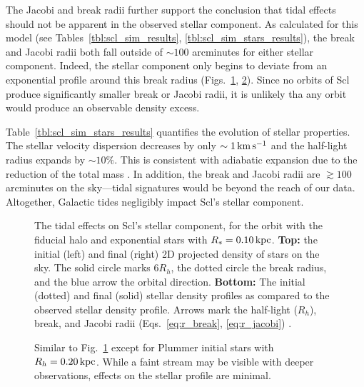 The Jacobi and break radii further support the conclusion that tidal
effects should not be apparent in the observed stellar component. As
calculated for this model (see
Tables~\ref{tbl:scl_sim_results}, \ref{tbl:scl_sim_stars_results}), the
break and Jacobi radii both fall outside of \(\sim 100\) arcminutes for
either stellar component. Indeed, the stellar component only begins to
deviate from an exponential profile around this break radius
(Figs.~\ref{fig:scl_smallperi_i_f}, \ref{fig:scl_smallperi_plummer_i_f}).
Since no orbits of Scl produce significantly smaller break or Jacobi
radii, it is unlikely tha any orbit would produce an observable density
excess.

Table~\ref{tbl:scl_sim_stars_results} quantifies the evolution of
stellar properties. The stellar velocity dispersion decreases by only
\(\sim1\,{\rm km\,s^{-1}}\) and the half-light radius expands by \(\sim 10\%\). This
is consistent with adiabatic expansion due to the reduction of the total
mass \citep[e.g.,][]{stucker+2023}. In addition, the break and Jacobi
radii are \(\gtrsim 100\) arcminutes on the sky---tidal signatures would
be beyond the reach of our data. Altogether, Galactic tides negligibly
impact Scl's stellar component.

\begin{figure}
\centering
{}
\caption[Sculptor initial and final density profiles]{The tidal effects
on Scl's stellar component, for the \smallperi{} orbit with the fiducial
halo and exponential stars with \(R_s=0.10\,{\rm kpc}\). \textbf{Top:} the
initial (left) and final (right) 2D projected density of stars on the
sky. The solid circle marks \(6R_h\), the dotted circle the break
radius, and the blue arrow the orbital direction. \textbf{Bottom:} The
initial (dotted) and final (solid) stellar density profiles as compared
to the observed stellar density profile. Arrows mark the half-light
(\(R_h\)), break, and Jacobi radii
(Eqs.~\ref{eq:r_break}, \ref{eq:r_jacobi})
.}\label{fig:scl_smallperi_i_f}
\end{figure}

\begin{figure}
\centering
{}
\caption[Sculptor Plummer initial and final density profiles]{Similar to
Fig.~\ref{fig:scl_smallperi_i_f} except for Plummer initial stars with
\(R_h = 0.20\,{\rm kpc}\). While a faint stream may be visible with deeper
observations, effects on the stellar profile are
minimal.}\label{fig:scl_smallperi_plummer_i_f}
\end{figure}


